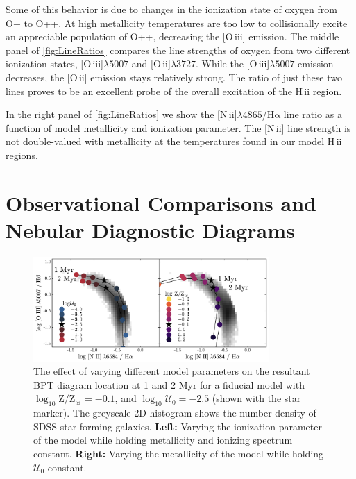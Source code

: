 \documentclass[trackchanges, twocolumn, tighten]{aastex61}
\newcommand{\Fig}[1]{\autoref{fig:#1}}
\newcommand{\logten}{\ensuremath{\log_{10}}}
\newcommand{\nii}{[N\,{\sc ii}]\xspace}
\newcommand{\oiii}{[O\,{\sc iii}]\xspace}
\newcommand{\oii}{[O\,{\sc ii}]\xspace}
\newcommand{\ha}{\ensuremath{\mathrm{H\alpha}}}
\newcommand{\hii}{H\,{\sc ii}\xspace}
\newcommand\lam[1]{\ensuremath{\lambda #1}}
\newcommand{\logZeq}[1]{\ensuremath{\logten \mathrm{Z}/\mathrm{Z}_{\sun} = #1}}
\newcommand{\U}{\ensuremath{\mathcal{U}_{0}}}
\newcommand{\logU}{\ensuremath{\logten \mathcal{U}_0}}
\newcommand\niiha{\nii{}\lam{4865}/\ha{}}
\begin{document}
Some of this behavior is due to changes in the ionization state of oxygen from O+ to O++. At high metallicity temperatures are too low to collisionally excite an appreciable population of O++, decreasing the \oiii{} emission. The middle panel of \Fig{LineRatios} compares the line strengths of oxygen from two different ionization states, \oiii{}\lam{5007} and \oii{}\lam{3727}. While the \oiii{}\lam{5007} emission decreases, the \oii{} emission stays relatively strong. The ratio of just these two lines proves to be an excellent probe of the overall excitation of the \hii region.

In the right panel of \Fig{LineRatios} we show the \niiha{} line ratio as a function of model metallicity and ionization parameter. The \nii{} line strength is not double-valued with metallicity at the temperatures found in our model \hii regions.

\section{Observational Comparisons and Nebular Diagnostic Diagrams} \label{sec:models:diagnostics}

\begin{figure}[ht!]
    \begin{centering}
        \includegraphics[width=0.8\textwidth]{f15.pdf}
        \caption{The effect of varying different model parameters on the resultant BPT diagram location at 1 and 2 Myr for a fiducial model with \logZeq{-0.1}, and $\logU = -2.5$ (shown with the star marker). The greyscale 2D histogram shows the number density of SDSS star-forming galaxies. \textbf{Left:} Varying the ionization parameter of the model while holding metallicity and ionizing spectrum constant. \textbf{Right:} Varying the metallicity of the model while holding \U{} constant.}
        \label{fig:BPTintro}
    \end{centering}
\end{figure}
\end{document}
